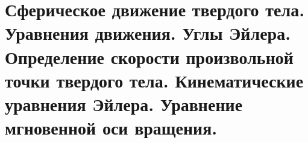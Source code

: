 \chapter{Сферическое движение твердого тела. Уравнения движения. Углы Эйлера.
Определение скорости произвольной точки твердого тела. Кинематические
уравнения Эйлера. Уравнение мгновенной оси вращения.}

\newpage
